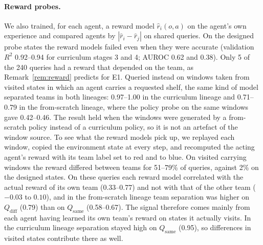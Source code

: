 \documentclass{article}
\theoremstyle{remark}
\begin{document}
\paragraph{Reward probes.} We also trained, for each agent, a reward model $\hat r_i(o,a)$ on the agent's own experience and
compared agents by $|\hat r_i-\hat r_j|$ on shared queries. On the designed probe states the reward models failed even when they
were accurate (validation $R^2$ 0.92--0.94 for curriculum stages 3 and 4; AUROC 0.62 and 0.38). Only 5 of the 240 queries had
a reward that depended on the team, as Remark~\ref{rem:reward} predicts for E1. Queried instead on windows taken from visited
states in which an agent carries a requested shelf, the same kind of model separated teams in both lineages: 0.97--1.00 in the
curriculum lineage and 0.71--0.79 in the from-scratch lineage, where the policy probe on the same windows gave 0.42--0.46. The
result held when the windows were generated by a from-scratch policy instead of a curriculum policy, so it is not an artefact
of the window source. To see what the reward models pick up, we replayed each window, copied the environment state at every
step, and recomputed the acting agent's reward with its team label set to red and to blue. On visited carrying windows the
reward differed between teams for 51--79\% of queries, against 2\% on the designed states. On these queries each reward model
correlated with the actual reward of its own team (0.33--0.77) and not with that of the other team ($-0.03$ to $0.10$), and in
the from-scratch lineage team separation was higher on $Q_{\mathrm{diff}}$ (0.79) than on $Q_{\mathrm{same}}$ (0.58--0.67).
The signal therefore comes mainly from each agent having learned its own team's reward on states it actually visits. In the
curriculum lineage separation stayed high on $Q_{\mathrm{same}}$ (0.95), so differences in visited states contribute there as
well.
\end{document}
